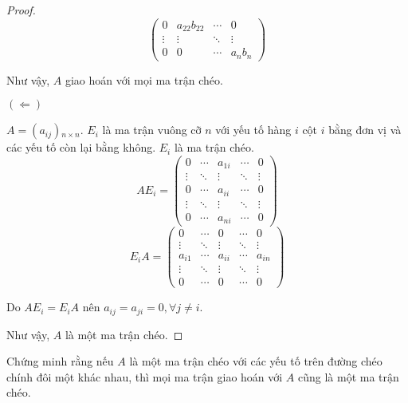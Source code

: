 \documentclass[class=nhvh-linear-algebra,crop=false]{standalone}
\begin{document}
\begin{proof}
\[\begin{pmatrix}
            0            & a_{22}b_{22} & \cdots & 0          \\
            \vdots       & \vdots       & \ddots & \vdots     \\
            0            & 0            & \cdots & a_{n}b_{n}
        \end{pmatrix}
    \]
    \par Như vậy, $A$ giao hoán với mọi ma trận chéo.
    \par $(\Leftarrow)$
    \par $A = (a_{ij}){}_{n\times n}$. $E_{i}$ là ma trận vuông cỡ $n$ với yếu tố hàng $i$ cột $i$ bằng đơn vị và các yếu tố còn lại bằng không. $E_{i}$ là ma trận chéo.
    \[
        AE_{i} =
        \begin{pmatrix}
            0      & \cdots & a_{1i} & \cdots & 0      \\
            \vdots & \ddots & \vdots & \ddots & \vdots \\
            0      & \cdots & a_{ii} & \cdots & 0      \\
            \vdots & \ddots & \vdots & \ddots & \vdots \\
            0      & \cdots & a_{ni} & \cdots & 0
        \end{pmatrix}
    \]
    \[
        E_{i}A =
        \begin{pmatrix}
            0      & \cdots & 0      & \cdots & 0      \\
            \vdots & \ddots & \vdots & \ddots & \vdots \\
            a_{i1} & \cdots & a_{ii} & \cdots & a_{in} \\
            \vdots & \ddots & \vdots & \ddots & \vdots \\
            0      & \cdots & 0      & \cdots & 0
        \end{pmatrix}
    \]
    \par Do $AE_{i} = E_{i}A$ nên $a_{ij} = a_{ji} = 0, \forall j\ne i$.
    \par Như vậy, $A$ là một ma trận chéo.
\end{proof}

\begin{exercise}
    Chứng minh rằng nếu $A$ là một ma trận chéo với các yếu tố trên đường chéo chính đôi một khác nhau, thì mọi ma trận giao hoán với $A$ cũng là một ma trận chéo.
\end{exercise}
\end{document}
